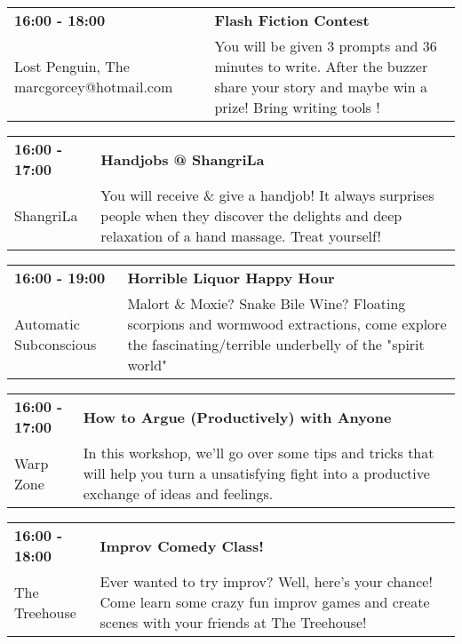 \begin{tabular}{ p{1in} p{2.2in} }
    \textbf{16:00 - 18:00} & \textbf{Flash Fiction Contest} \\
    Lost Penguin, The \newline marcgorcey@hotmail.com & You will be given 3 prompts and 36 minutes to write.  After the buzzer share your story and maybe win a prize!  Bring writing tools ! \\
    \hline 
\end{tabular}
    
\begin{tabular}{ p{1in} p{2.2in} }
    \textbf{16:00 - 17:00} & \textbf{Handjobs @ ShangriLa} \\
    ShangriLa \newline  & You will receive \& give a handjob! It always surprises people when they discover the delights and deep relaxation of a hand massage. Treat yourself! \\
    \hline 
\end{tabular}
    
\begin{tabular}{ p{1in} p{2.2in} }
    \textbf{16:00 - 19:00} & \textbf{Horrible Liquor Happy Hour} \\
    Automatic Subconscious \newline  & Malort \& Moxie? Snake Bile Wine? Floating scorpions and wormwood extractions, come explore the fascinating/terrible underbelly of the "spirit world" \\
    \hline 
\end{tabular}
    
\begin{tabular}{ p{1in} p{2.2in} }
    \textbf{16:00 - 17:00} & \textbf{How to Argue (Productively) with Anyone} \\
    Warp Zone \newline  & In this workshop, we'll go over some tips and tricks that will help you turn a unsatisfying fight into a productive exchange of ideas and feelings. \\
    \hline 
\end{tabular}
    
\begin{tabular}{ p{1in} p{2.2in} }
    \textbf{16:00 - 18:00} & \textbf{Improv Comedy Class!} \\
    The Treehouse \newline  & Ever wanted to try improv? Well, here's your chance! Come learn some crazy fun improv games and create scenes with your friends at The Treehouse! \\
    \hline 
\end{tabular}
    
